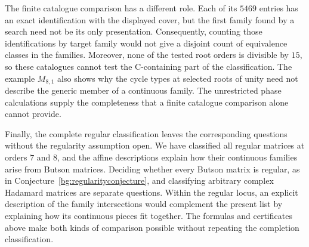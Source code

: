 \documentclass[11pt,a4paper]{article}
\theoremstyle{plain}
\theoremstyle{definition}
\numberwithin{equation}{section}
\begin{document}
The finite catalogue comparison has a different role. Each of its $5469$ entries has an exact identification with the displayed cover, but the first family found by a search need not be its only presentation. Consequently, counting those identifications by target family would not give a disjoint count of equivalence classes in the families. Moreover, none of the tested root orders is divisible by $15$, so these catalogues cannot test the C-containing part of the classification. The example $M_{8,1}$ also shows why the cycle types at selected roots of unity need not describe the generic member of a continuous family. The unrestricted phase calculations supply the completeness that a finite catalogue comparison alone cannot provide.

Finally, the complete regular classification leaves the corresponding questions without the regularity assumption open. We have classified all regular matrices at orders $7$ and $8$, and the affine descriptions explain how their continuous families arise from Butson matrices. Deciding whether every Butson matrix is regular, as in Conjecture~\ref{bg:regularityconjecture}, and classifying arbitrary complex Hadamard matrices are separate questions. Within the regular locus, an explicit description of the family intersections would complement the present list by explaining how its continuous pieces fit together. The formulas and certificates above make both kinds of comparison possible without repeating the completion classification.
\end{document}
